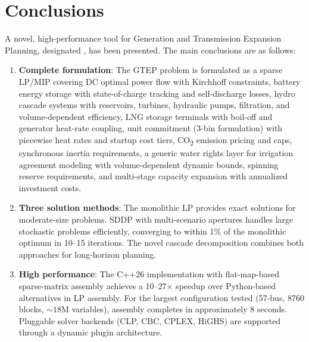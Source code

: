 
\section{Conclusions}
\label{sec:conclusions}

A novel, high-performance tool for Generation and Transmission Expansion
Planning, designated \gtopt{}, has been presented.  The main conclusions
are as follows:

\begin{enumerate}
  \item \textbf{Complete formulation}: The GTEP problem is formulated
    as a sparse LP/MIP covering DC optimal power flow with Kirchhoff
    constraints, battery energy storage with state-of-charge tracking
    and self-discharge losses, hydro cascade systems with reservoirs,
    turbines, hydraulic pumps, filtration, and volume-dependent
    efficiency, LNG storage terminals with boil-off and generator
    heat-rate coupling, unit commitment (3-bin formulation) with
    piecewise heat rates and startup cost tiers,
    CO\textsubscript{2} emission pricing and caps, synchronous
    inertia requirements, a generic water rights layer for
    irrigation agreement modeling with volume-dependent dynamic
    bounds, spinning reserve requirements, and multi-stage capacity
    expansion with annualized investment costs.

  \item \textbf{Three solution methods}: The monolithic LP provides
    exact solutions for moderate-size problems.  SDDP with
    multi-scenario apertures handles large stochastic problems
    efficiently, converging to within 1\% of the monolithic optimum
    in 10--15 iterations.  The novel cascade decomposition combines
    both approaches for long-horizon planning.

  \item \textbf{High performance}: The C++26 implementation with
    flat-map-based sparse-matrix assembly achieves a 10--27$\times$
    speedup over Python-based alternatives in LP assembly.  For the
    largest configuration tested (57-bus, 8760 blocks, ${\sim}18$M
    variables), assembly completes in approximately 8 seconds.
    Pluggable solver backends (CLP, CBC, CPLEX, HiGHS) are supported
    through a dynamic plugin architecture.


\end{enumerate}
